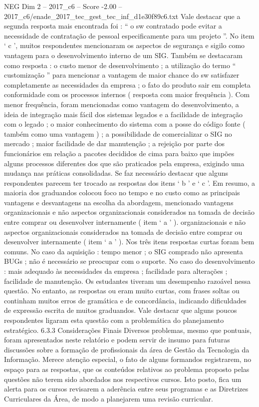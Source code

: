 \begin{textsample}{NEG Dim 2 – 2017\_c6 – Score -2.00 – 2017\_c6/enade\_2017\_tec\_gest\_tec\_inf\_d1e30f89c6.txt}
Vale destacar que a segunda resposta mais encontrada foi : “ o sw contratado pode evitar a necessidade de contratação de pessoal especificamente para um projeto ”.
No item ‘ c ’, muitos respondentes mencionaram os aspectos de segurança e sigilo como vantagem para o desenvolvimento interno de um SIG.
Também se destacaram como resposta : o custo menor de desenvolvimento ; a utilização do termo “ customização ” para mencionar a vantagem de maior chance do sw satisfazer completamente as necessidades da empresa ; o fato do produto sair em completa conformidade com os processos internos ( resposta com maior frequência ).
Com menor frequência, foram mencionadas como vantagem do desenvolvimento, a ideia de integração mais fácil dos sistemas legados e a facilidade de integração com o legado ; o maior conhecimento do sistema com a posse do código fonte ( também como uma vantagem ) ; a possibilidade de comercializar o SIG no mercado ; maior facilidade de dar manutenção ; a rejeição por parte dos funcionários em relação a pacotes decididos de cima para baixo que impões alguns processos diferentes dos que são praticados pela empresa, exigindo uma mudança nas práticas consolidadas.
Se faz necessário destacar que alguns respondentes parecem ter trocado as respostas dos itens ‘ b ’ e ‘ c ’.
Em resumo, a maioria dos graduandos colocou foco no tempo e no custo como as principais vantagens e desvantagens na escolha da abordagem, mencionado vantagens organizacionais e não aspectos organizacionais considerados na tomada de decisão entre comprar ou desenvolver internamente ( item ‘ a ’ ). organizacionais e não aspectos organizacionais considerados na tomada de decisão entre comprar ou desenvolver internamente ( item ‘ a ’ ).
Nos três itens respostas curtas foram bem comuns.
No caso da aquisição : tempo menor ; o SIG comprado não apresenta BUGs ; não é necessário se preocupar com o suporte.
No caso do desenvolvimento : mais adequado às necessidades da empresa ; facilidade para alterações ; facilidade de manutenção.
Os estudantes tiveram um desempenho razoável nessa questão.
No entanto, as respostas ou eram muito curtas, com frases soltas ou continham muitos erros de gramática e de concordância, indicando dificuldades de expressão escrita de muitos graduandos.
Vale destacar que alguns poucos respondentes ligaram esta questão com a problemática do planejamento estratégico. 6.3.3 Considerações Finais Diversos problemas, mesmo que pontuais, foram apresentados neste relatório e podem servir de insumo para futuras discussões sobre a formação de profissionais da área de Gestão da Tecnologia da Informação.
Merece atenção especial, o fato de alguns formandos registrarem, no espaço para as respostas, que os conteúdos relativos ao problema proposto pelas questões não terem sido abordados nos respectivos cursos.
Isto posto, fica um alerta para os cursos revisarem a aderência entre seus programas e as Diretrizes Curriculares da Área, de modo a planejarem uma revisão curricular.

\end{textsample}
